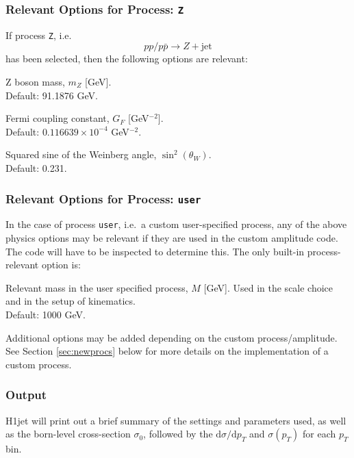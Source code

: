 \documentclass[12pt,a4wide]{article}
\begin{document}
\subsubsection{Relevant Options for Process: \texttt{Z}}
If process \texttt{Z}, i.e.\ 
\begin{equation}
	pp/p\bar{p} \rightarrow Z + \text{jet}
\end{equation}
has been selected, then the following options are relevant: 
\begin{description}[labelindent=\parindent, labelwidth =\widthof{\bfseries9999999999999999999999}, leftmargin = !] 
	\item[\texttt{--mZ <value>}] Z boson mass, $m_Z$ [GeV]. \\ Default: 91.1876 GeV.
	\item[\texttt{--gf <value>}] Fermi coupling constant, $G_F$ [GeV$^{-2}$]. \\ Default: $0.116639 \times 10^{-4}$ GeV$^{-2}$. 
	\item[\texttt{--sinwsq <value>}] Squared sine of the Weinberg angle, $\sin^2\left ( \theta_W \right )$. \\ Default: 0.231. 
\end{description}

\subsubsection{Relevant Options for Process: \texttt{user}}
In the case of process \texttt{user}, i.e.\ a custom user-specified process, any of the above physics options may be relevant if they are used in the custom amplitude code. The code will have to be inspected to determine this. The only built-in process-relevant option is: 
\begin{description}[labelindent=\parindent, labelwidth =\widthof{\bfseries9999999999999999999999}, leftmargin = !] 
	\item[\texttt{--mass <value>}] Relevant mass in the user specified process, $M$ [GeV]. Used in the scale choice and in the setup of kinematics. \\ Default: 1000 GeV. 
\end{description}
Additional options may be added depending on the custom process/amplitude. See Section \ref{sec:newprocs} below for more details on the implementation of a custom process. 

\subsubsection{Output}
H1jet will print out a brief summary of the settings and parameters used, as well as the born-level cross-section $\sigma_0$, followed by the $\mathrm{d}\sigma/\mathrm{d}p_{T}$ and $\sigma(p_{T})$ for each $p_T$ bin. \\ 
\end{document}
